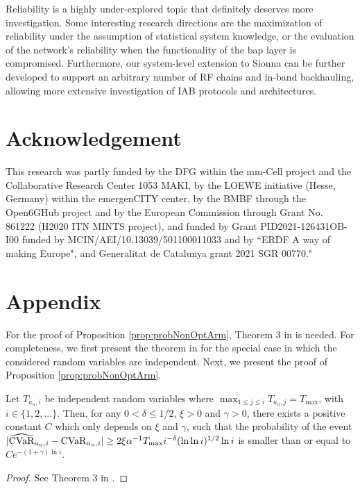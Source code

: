 Reliability is a highly under-explored topic that definitely deserves more investigation. Some interesting research directions are the maximization of reliability under the assumption of statistical system knowledge, or the evaluation of the network's reliability when the functionality of the \gls{bap} layer is compromised.
Furthermore, our system-level extension to Sionna can be further developed to support an arbitrary number of RF chains and in-band backhauling, allowing more extensive investigation of IAB protocols and architectures.

 \section{Acknowledgement}
This research was partly funded by the DFG within the mm-Cell project and the Collaborative Research Center 1053 MAKI, by the LOEWE initiative (Hesse, Germany) within the emergenCITY center, by the BMBF through the Open6GHub project and by the European Commission through Grant No. 861222 (H2020 ITN MINTS project), and funded by Grant PID2021-126431OB-I00 funded by MCIN/AEI/10.13039/501100011033 and by “ERDF A way of making Europe", and Generalitat de Catalunya grant 2021 SGR 00770." 
\section*{Appendix}
\label{sec:appendix}
For the proof of Proposition \ref{prop:probNonOptArm}, Theorem 3 in \cite{Luo2017} is needed. For completeness, we first present the theorem in \cite{Luo2017} for the special case in which the considered random variables are independent. Next, we present the proof of Proposition \ref{prop:probNonOptArm}.
\begin{theorem} \label{eq:Theorem2_part2}
Let $T_{a_n,i}$ be independent random variables where $\max_{1\leq j\leq i}{T_{a_n,j}} = T_\mathrm{max}$, with $i\in\{1,2,...\}$.
Then, for any $0 < \delta \leq 1/2$, $\xi > 0$ and $\gamma > 0$, there exists a positive constant $C$ which only depends on $\xi$ and $\gamma$, such that the probability of the event $|{\widehat{\mathrm{CVaR}}}_{a_n,i}-{\mathrm{CVaR}}_{a_n,i}| \geq 2\xi\alpha^{-1}T_{\max} i^{-\delta}(\ln{\ln{i}})^{1/2}\ln{i}$ is smaller than or equal to $Ce^{-(1+\gamma)\ln i}$.
\end{theorem}
\begin{proof}
See Theorem 3 in \cite{Luo2017}.
\end{proof}

